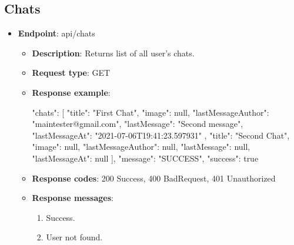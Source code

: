 \subsection{Chats}\label{subsec:chats}
\begin{itemize}
    \item \textbf{Endpoint}: api/chats
    \begin{itemize}
        \item \textbf{Description}: Returns list of all user's chats.
        \item \textbf{Request type}: GET
        \item \textbf{Response example}:
        \begin{spverbatim}
        {
            "chats": [
                {
                "title": "First Chat",
                "image": null,
                "lastMessageAuthor": "maintester@gmail.com",
                "lastMessage": "Second message",
                "lastMessageAt": "2021-07-06T19:41:23.597931"
                },
                {
                "title": "Second Chat",
                "image": null,
                "lastMessageAuthor": null,
                "lastMessage": null,
                "lastMessageAt": null
                }
            ],
            "message": "SUCCESS",
            "success": true
        }
        \end{spverbatim}
        \item \textbf{Response codes}: 200 Success, 400 BadRequest, 401 Unauthorized
        \item \textbf{Response messages}:
        \begin{enumerate}
            \item Success.
            \item User not found.
        \end{enumerate}
    \end{itemize}


\end{itemize}
